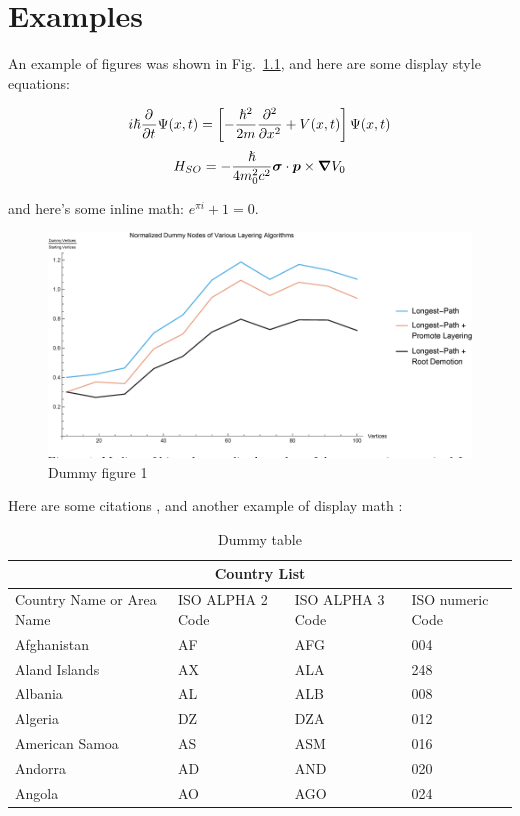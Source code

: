 \chapter{Examples}
\label{c:examples}

An example of figures was shown in Fig.\ \ref{fig:dummy1}, and here are some
display style equations:

\begin{equation*}
	i \hslash \pdv[]{}{t} \Psi (x, t) = \left[ -\frac{\hslash^2}{2m} \pdv[2]{}{x}
	+ V(x, t) \right] \Psi (x, t)
\end{equation*}
\begin{equation*}
	H_{SO} = - \frac{\hslash}{4 m_0^2 c^2} \boldsymbol{\sigma} \cdot \boldsymbol{p}
	\times \grad V_0
\end{equation*}


and here's some inline math: $ e^{\pi i} + 1 = 0$.


\begin{figure}[bt]
	\centering
	\includegraphics[width=0.6\linewidth]{./figures/dummy1.png}
	\caption{Dummy figure 1}%
	\label{fig:dummy1}
\end{figure}

\noindent Here are some citations \cite{einstein, latexcompanion}, and another 
example of display math \cite{knuthwebsite}:

\begin{table}[tb]
\centering
\caption{Dummy table}
\label{tab:dummy_tab}
\begin{tabular}{ |p{3cm}||p{3cm}|p{3cm}|p{3cm}|  }
 \hline
 \multicolumn{4}{|c|}{Country List} \\
 \hline
 Country Name     or Area Name& ISO ALPHA 2 Code &ISO ALPHA 3 Code&ISO numeric Code\\
 \hline
 Afghanistan   & AF    &AFG&   004\\
 Aland Islands&   AX  & ALA   &248\\
 Albania &AL & ALB&  008\\
 Algeria    &DZ & DZA&  012\\
 American Samoa&   AS  & ASM&016\\
 Andorra& AD  & AND   &020\\
 Angola& AO  & AGO&024\\
 \hline
\end{tabular} 
\end{table}

